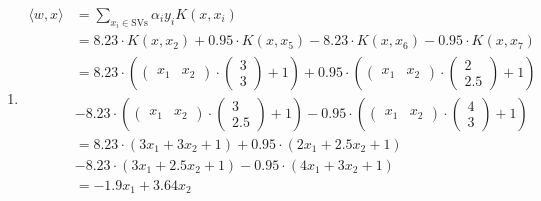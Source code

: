 \documentclass[a4paper,12pt]{article}
\begin{document}
\begin{enumerate}
	\item
	\begin{align*}
		\langle w, x \rangle &= \sum_{x_i \in \text{SVs}} \alpha_i y_i K(x, x_i) \\
			&= 8.23 \cdot K(x, x_2) + 0.95 \cdot K(x, x_5) - 8.23 \cdot K(x, x_6) - 0.95 \cdot K(x, x_7) \\
			&= 8.23 \cdot \left( \begin{pmatrix} x_1 & x_2 \end{pmatrix} \cdot  \begin{pmatrix} 3 \\ 3 \end{pmatrix} + 1 \right) + 0.95 \cdot \left(\begin{pmatrix} x_1 & x_2 \end{pmatrix} \cdot \begin{pmatrix} 2 \\ 2.5 \end{pmatrix} + 1 \right) \\ &- 8.23 \cdot \left( \begin{pmatrix} x_1 & x_2 \end{pmatrix} \cdot \begin{pmatrix} 3 \\ 2.5 \end{pmatrix} + 1 \right) - 0.95 \cdot \left( \begin{pmatrix} x_1 & x_2 \end{pmatrix} \cdot \begin{pmatrix} 4 \\ 3 \end{pmatrix} + 1 \right) \\
			&= 8.23 \cdot \left( 3x_1 + 3x_2 + 1\right) + 0.95 \cdot \left( 2x_1 + 2.5x_2 + 1\right) \\ &- 8.23 \cdot \left( 3x_1 + 2.5x_2 + 1\right) - 0.95 \cdot \left( 4x_1 + 3x_2 + 1\right) \\
			&= -1.9x_1 + 3.64x_2
		\end{align*}


\end{enumerate}
\end{document}
